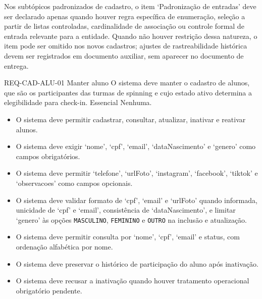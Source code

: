 Nos subtópicos padronizados de cadastro, o item `Padronização de entradas' deve ser declarado apenas quando houver regra específica de enumeração, seleção a partir de listas controladas, cardinalidade de associação ou controle formal de entrada relevante para a entidade. Quando não houver restrição dessa natureza, o item pode ser omitido nos novos cadastros; ajustes de rastreabilidade histórica devem ser registrados em documento auxiliar, sem aparecer no documento de entrega.


\reqfunccad
{REQ-CAD-ALU-01 Manter aluno}
{O sistema deve manter o cadastro de alunos, que são os participantes das turmas de spinning e cujo estado ativo determina a elegibilidade para check-in.}
{Essencial}
{Nenhuma.}
{\begin{itemize}[leftmargin=0.6cm]
    \item O sistema deve permitir cadastrar, consultar, atualizar, inativar e reativar alunos.
    \item O sistema deve exigir `nome', `cpf', `email', `dataNascimento' e `genero' como campos obrigatórios.
    \item O sistema deve permitir `telefone', `urlFoto', `instagram', `facebook', `tiktok' e `observacoes' como campos opcionais.
    \item O sistema deve validar formato de `cpf', `email' e `urlFoto' quando informada, unicidade de `cpf' e `email', consistência de `dataNascimento', e limitar `genero' às opções \texttt{MASCULINO}, \texttt{FEMININO} e \texttt{OUTRO} na inclusão e atualização.
    \item O sistema deve permitir consulta por `nome', `cpf', `email' e status, com ordenação alfabética por nome.
    \item O sistema deve preservar o histórico de participação do aluno após inativação.
    \item O sistema deve recusar a inativação quando houver tratamento operacional obrigatório pendente.
\end{itemize}}


